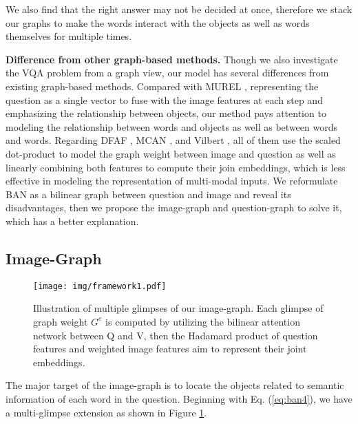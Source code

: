 \documentclass[10pt,twocolumn,letterpaper]{article}
\begin{document}
We also find that the right answer may not be decided at once, therefore we stack our graphs to make the words interact with the objects as well as words themselves for multiple times.

\textbf{Difference from other graph-based methods.} Though we also investigate the VQA problem from a graph view, our model has several differences from existing graph-based methods. Compared with MUREL \cite{cadene2019murel}, representing the question as a single vector to fuse with the image features at each step and emphasizing the relationship between objects, our method pays attention to modeling the relationship between words and objects as well as between words and words. Regarding DFAF \cite{gao2019dynamic}, MCAN \cite{yu2019deep}, and Vilbert \cite{lu2019vilbert}, all of them use the scaled dot-product \cite{vaswani2017attention} to model the graph weight between image and question as well as linearly combining both features to compute their join embeddings, which is less effective in modeling the representation of multi-modal inputs. We reformulate BAN as a bilinear graph between question and image and reveal its disadvantages, then we propose the image-graph and question-graph to solve it, which has a better explanation.

\subsection{Image-Graph}
\begin{figure}
	\centering
	\texttt{[image: img/framework1.pdf]}
	\caption{Illustration of multiple glimpses of our image-graph. Each glimpse of graph weight $G^e$ is computed by utilizing the bilinear attention network between Q and V, then the Hadamard product of question features and weighted image features aim to represent their joint embeddings.}
	\label{fig:framework1}
\vspace{-5pt}
\end{figure}
The major target of the image-graph is to locate the objects related to semantic information of each word in the question. Beginning with Eq. (\ref{eq:ban4}), we have a multi-glimpse extension as shown in Figure \ref{fig:framework1}. 
\end{document}
